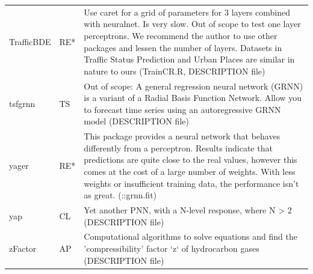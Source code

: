 \begin{Schunk}
\begin{longtable}[t]{ll>{\raggedright\arraybackslash}p{10cm}}
TrafficBDE & RE* & Use caret for a grid of parameters for 3 layers combined with neuralnet. Is very slow. Out of scope to test one layer perceptrons. We recommend the author to use other packages and lessen the number of layers. Datasets in Traffic Status Prediction and Urban Places are similar in nature to ours (TrainCR.R, DESCRIPTION file)\\
tsfgrnn & TS & Out of scope: A general regression neural network (GRNN) is a variant of a Radial Basis Function Network. Allow you to forecast time series using an autoregressive GRNN model (DESCRIPTION file)\\
\addlinespace
yager & RE* & This package provides a neural network that behaves differently from a perceptron. Results indicate that predictions are quite close to the real values, however this comes at the cost of a large number of weights. With less weights or insufficient training data, the performance isn't as great. (::grnn.fit)\\
yap & CL & Yet another PNN, with a N-level response, where N > 2 (DESCRIPTION file)\\
zFactor & AP & Computational algorithms to solve equations and find the 'compressibility' factor `z` of hydrocarbon gases (DESCRIPTION file)\\*
\end{longtable}
\endgroup{}

\end{Schunk}


\address{%
Salsabila Mahdi\\
Universitas Syiah Kuala\\%
JL. Syech Abdurrauf No.3, Aceh 23111, Indonesia\\
%
%
\\\textit{ORCiD: \href{https://orcid.org/0000-0002-2559-4154}{0000-0002-2559-4154}}%
\\\href{mailto:bila.mahdi@mhs.unsyiah.ac.id}{\nolinkurl{bila.mahdi@mhs.unsyiah.ac.id}}
}

\address{%
Akshaj Verma\\
Manipal Institute of Technology\\%
Manipal, Karnataka, 576104, India\\
%
%
\\\textit{ORCiD: \href{https://orcid.org/0000-0002-3936-0033}{0000-0002-3936-0033}}%
\\\href{mailto:akshajverma7@gmail.com}{\nolinkurl{akshajverma7@gmail.com}}
}

\address{%
Christophe Dutang\\
Université Paris-Dauphine, University PSL, CNRS, CEREMADE\\%
Place du Maréchal de Lattre de Tassigny, 75016 Paris, France\\
%
%
\\\textit{ORCiD: \href{https://orcid.org/0000-0001-6732-1501}{0000-0001-6732-1501}}%
\\\href{mailto:dutang@ceremade.dauphine.fr}{\nolinkurl{dutang@ceremade.dauphine.fr}}
}

